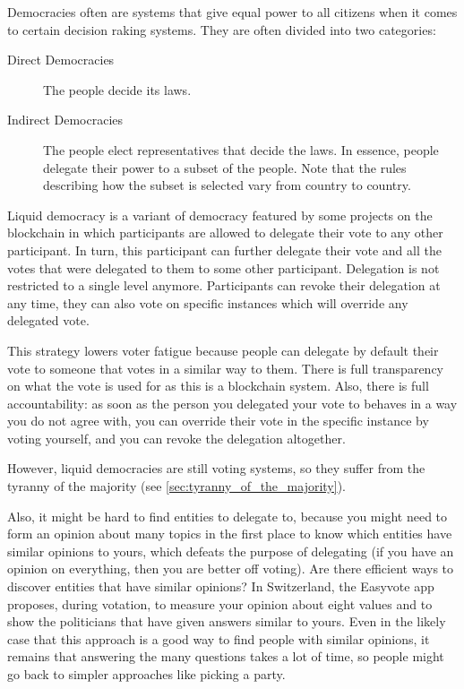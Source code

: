 Democracies often are systems that give equal power to all citizens when it comes to certain decision raking systems.
They are often divided into two categories:

\begin{description}
  \item[Direct Democracies]
    The people decide its laws.
  \item[Indirect Democracies]
    The people elect representatives that decide the laws.
    In essence, people delegate their power to a subset of the people.
    Note that the rules describing how the subset is selected vary from country to country.
\end{description}

Liquid democracy is a variant of democracy featured by some projects on the blockchain in which participants are allowed to delegate their vote to any other participant.
In turn, this participant can further delegate their vote and all the votes that were delegated to them to some other participant.
Delegation is not restricted to a single level anymore.
Participants can revoke their delegation at any time, they can also vote on specific instances which will override any delegated vote.

This strategy lowers voter fatigue because people can delegate by default their vote to someone that votes in a similar way to them.
There is full transparency on what the vote is used for as this is a blockchain system.
Also, there is full accountability: as soon as the person you delegated your vote to behaves in a way you do not agree with, you can override their vote in the specific instance by voting yourself, and you can revoke the delegation altogether.

However, liquid democracies are still voting systems, so they suffer from the tyranny of the majority (see \cref{sec:tyranny_of_the_majority}).

Also, it might be hard to find entities to delegate to, because you might need to form an opinion about many topics in the first place to know which entities have similar opinions to yours, which defeats the purpose of delegating (if you have an opinion on everything, then you are better off voting).
Are there efficient ways to discover entities that have similar opinions?
In Switzerland, the Easyvote app proposes, during votation, to measure your opinion about eight values and to show the politicians that have given answers similar to yours.
Even in the likely case that this approach is a good way to find people with similar opinions, it remains that answering the many questions takes a lot of time, so people might go back to simpler approaches like picking a party.

